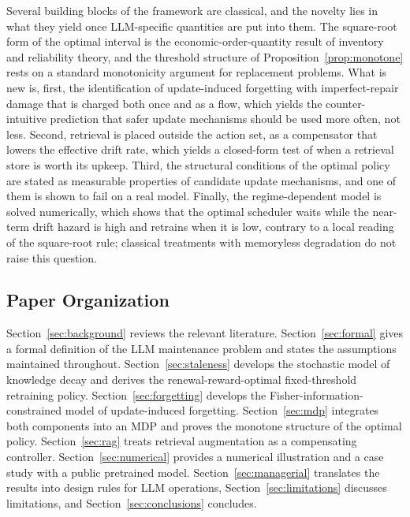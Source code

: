 \documentclass[electronics,article,submit,pdftex,moreauthors]{Definitions/mdpi}
\begin{document}
Several building blocks of the framework are classical, and the novelty lies in what they yield once LLM-specific quantities are put into them. The square-root form of the optimal interval is the economic-order-quantity result of inventory and reliability theory, and the threshold structure of Proposition~\ref{prop:monotone} rests on a standard monotonicity argument for replacement problems. What is new is, first, the identification of update-induced forgetting with imperfect-repair damage that is charged both once and as a flow, which yields the counter-intuitive prediction that safer update mechanisms should be used more often, not less. Second, retrieval is placed outside the action set, as a compensator that lowers the effective drift rate, which yields a closed-form test of when a retrieval store is worth its upkeep. Third, the structural conditions of the optimal policy are stated as measurable properties of candidate update mechanisms, and one of them is shown to fail on a real model. Finally, the regime-dependent model is solved numerically, which shows that the optimal scheduler waits while the near-term drift hazard is high and retrains when it is low, contrary to a local reading of the square-root rule; classical treatments with memoryless degradation do not raise this question.

\subsection{Paper Organization}

Section~\ref{sec:background} reviews the relevant literature. Section~\ref{sec:formal} gives a formal definition of the LLM maintenance problem and states the assumptions maintained throughout. Section~\ref{sec:staleness} develops the stochastic model of knowledge decay and derives the renewal-reward-optimal fixed-threshold retraining policy. Section~\ref{sec:forgetting} develops the Fisher-information-constrained model of update-induced forgetting. Section~\ref{sec:mdp} integrates both components into an MDP and proves the monotone structure of the optimal policy. Section~\ref{sec:rag} treats retrieval augmentation as a compensating controller. Section~\ref{sec:numerical} provides a numerical illustration and a case study with a public pretrained model. Section~\ref{sec:managerial} translates the results into design rules for LLM operations, Section~\ref{sec:limitations} discusses limitations, and Section~\ref{sec:conclusions} concludes.

\end{document}
